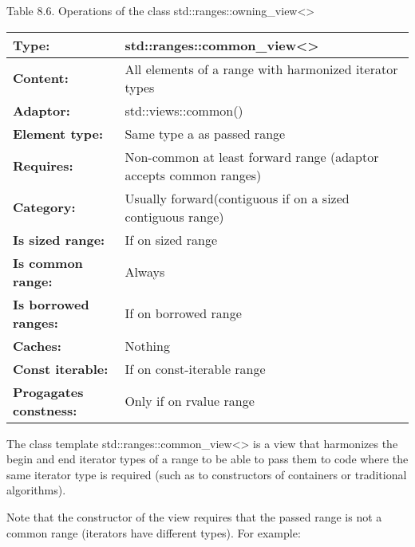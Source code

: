\begin{center}
Table 8.6. Operations of the class std::ranges::owning\_view<>
\end{center}


\begin{longtable}[c]{|l|l|}
\hline
\textbf{Type:}     & std::ranges::common\_view\textless{}\textgreater{}                \\ \hline
\endfirsthead
%
\endhead
%
\textbf{Content:}  & All elements of a range with harmonized iterator types            \\ \hline
\textbf{Adaptor:}              & std::views::common()        \\ \hline
\textbf{Element type:}         & Same type a as passed range \\ \hline
\textbf{Requires:} & Non-common at least forward range (adaptor accepts common ranges) \\ \hline
\textbf{Category:} & Usually forward(contiguous if on a sized contiguous range)        \\ \hline
\textbf{Is sized range:}       & If on sized range           \\ \hline
\textbf{Is common range:}      & Always                      \\ \hline
\textbf{Is borrowed ranges:}   & If on borrowed range        \\ \hline
\textbf{Caches:}               & Nothing                     \\ \hline
\textbf{Const iterable:}       & If on const-iterable range  \\ \hline
\textbf{Progagates constness:} & Only if on rvalue range     \\ \hline
\end{longtable}

The class template std::ranges::common\_view<> is a view that harmonizes the begin and end iterator types of a range to be able to pass them to code where the same iterator type is required (such as to constructors of containers or traditional algorithms).

Note that the constructor of the view requires that the passed range is not a common range (iterators have different types). For example:

